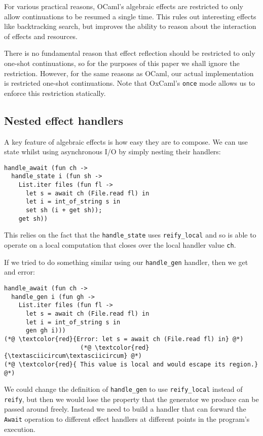 \documentclass[acmsmall, screen, nonacm]{acmart}
\theoremstyle{definition}
\begin{document}
For various practical reasons, OCaml's algebraic effects are restricted
to only allow continuations to be resumed a single time. This rules out
interesting effects like backtracking search, but improves the ability
to reason about the interaction of effects and resources.

There is no fundamental reason that effect reflection should be
restricted to only one-shot continuations, so for the purposes of this
paper we shall ignore the restriction. However, for the same reasons as
OCaml, our actual implementation is restricted one-shot
continuations. Note that OxCaml's \lstinline[style=oxcaml]{once}
mode\cite{lorenzen2024oxidizing} allows us to enforce this restriction
statically.

\subsection{Nested effect handlers}

A key feature of algebraic effects is how easy they are to compose. We
can use state whilst using asynchronous I/O by simply nesting their
handlers:
\begin{lstlisting}[style=oxcaml]
handle_await (fun ch ->
  handle_state i (fun sh ->
    List.iter files (fun fl ->
      let s = await ch (File.read fl) in
      let i = int_of_string s in
      set sh (i + get sh));
    get sh))
\end{lstlisting}

This relies on the fact that the \lstinline[style=oxcaml]{handle_state}
uses \lstinline[style=oxcaml]{reify_local} and so is able to operate on a
local computation that closes over the local handler value
\lstinline[style=oxcaml]{ch}.

If we tried to do something similar using our
\lstinline[style=oxcaml]{handle_gen} handler, then we get and error:
\begin{lstlisting}[style=oxcaml]
handle_await (fun ch ->
  handle_gen i (fun gh ->
    List.iter files (fun fl ->
      let s = await ch (File.read fl) in
      let i = int_of_string s in
      gen gh i)))
(*@ \textcolor{red}{Error: let s = await ch (File.read fl) in} @*)
                     (*@ \textcolor{red}{\textasciicircum\textasciicircum} @*)
(*@ \textcolor{red}{ This value is local and would escape its region.} @*)
\end{lstlisting}

We could change the definition of \lstinline[style=oxcaml]{handle_gen} to
use \lstinline[style=oxcaml]{reify_local} instead of
\lstinline[style=oxcaml]{reify}, but then we would lose the property that
the generator we produce can be passed around freely. Instead we need to
build a handler that can forward the \lstinline[style=oxcaml]{Await}
operation to different effect handlers at different points in the
program's execution.
\end{document}
